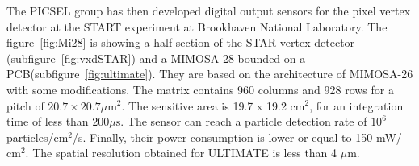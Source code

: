     The PICSEL group has then developed digital output sensors for the pixel vertex detector at the START experiment at Brookhaven National Laboratory\cite{}.
    The figure~\ref{fig:Mi28} is showing a half-section of the STAR vertex detector (subfigure~\ref{fig:vxdSTAR}) and a \gls{MIMOSA}-28 bounded on a PCB(subfigure~\ref{fig:ultimate}).
    They are based on the architecture of \gls{MIMOSA}-26 with some modifications.
    The matrix contains 960 columns and 928 rows for a pitch of $20.7 \times 20.7 \mu\text{m}^2$.
    The sensitive area is 19.7 x 19.2 $\text{cm}^2$, for an integration time of less than $200\mu\text{s}$.
    The sensor can reach a particle detection rate of $10^6$ particles/$\text{cm}^2$/s. 
    Finally, their power consumption is lower or equal to 150 mW/$\text{cm}^2$.
    The spatial resolution obtained for ULTIMATE is less than 4 $\mu\text{m}$.

  


